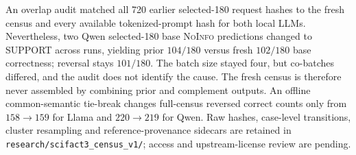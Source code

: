 An overlap audit matched all 720 earlier selected-180 request hashes to the fresh census and every available tokenized-prompt hash for both local LLMs. Nevertheless, two Qwen selected-180 base \textsc{NoInfo} predictions changed to SUPPORT across runs, yielding prior $104/180$ versus fresh $102/180$ base correctness; reversal stays $101/180$. The batch size stayed four, but co-batches differed, and the audit does not identify the cause. The fresh census is therefore never assembled by combining prior and complement outputs. An offline common-semantic tie-break changes full-census reversed correct counts only from $158\to159$ for Llama and $220\to219$ for Qwen. Raw hashes, case-level transitions, cluster resampling and reference-provenance sidecars are retained in \texttt{research/scifact3\_census\_v1/}; access and upstream-license review are pending.


